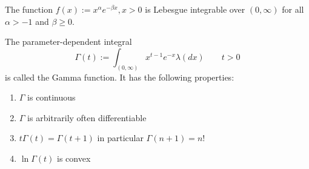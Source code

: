 \begin{prop}
The function \(f(x):=x^\alpha e^{-\beta x},x>0\) is Lebesgue integrable over \((0,\infty )\) for all \(\alpha >-1\) and \(\beta \geq 0.\)
\end{prop}

\begin{prop}
The parameter-dependent integral
\[
\Gamma (t):=\int _{(0,\infty )} x^{t-1}e^{-x}\lambda (dx) \qquad t>0
\]
is called the Gamma function. It has the following properties:

\begin{enumerate}
  \item \(\Gamma \) is continuous
  \item \(\Gamma \) is arbitrarily often differentiable
  \item \(t\Gamma (t)=\Gamma (t+1)\) in particular \(\Gamma (n+1)=n!\)
  \item \(\ln \Gamma (t)\) is convex
\end{enumerate}

\end{prop}

